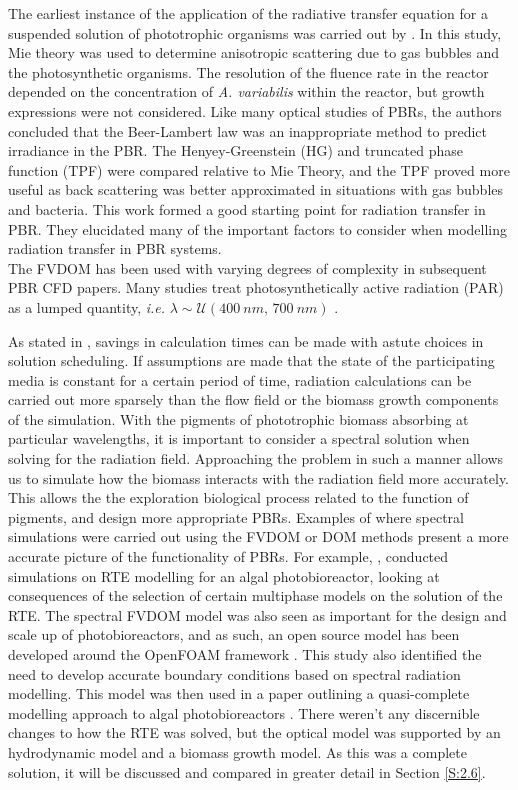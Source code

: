 The earliest instance of the application of the radiative transfer equation for a suspended solution of phototrophic organisms was carried out by \cite{Berberoglu2007}. In this study, Mie theory was used to determine anisotropic scattering due to gas bubbles and the photosynthetic organisms. The resolution of the fluence rate in the reactor depended on the concentration of \textit{A. variabilis} within the reactor, but growth expressions were not considered. Like many optical studies of PBRs, the authors concluded that the Beer-Lambert law was an inappropriate method to predict irradiance in the PBR. The Henyey-Greenstein (HG) and truncated phase function (TPF) were compared relative to Mie Theory, and the TPF proved more useful as back scattering was better approximated in situations with gas bubbles and bacteria. This work formed a good starting point for radiation transfer in PBR. They elucidated many of the important factors to consider when modelling radiation transfer in PBR systems. \\
The FVDOM has been used with varying degrees of complexity in subsequent PBR CFD papers. Many studies treat photosynthetically active radiation (PAR) as a lumped quantity, \textit{i.e.} $\lambda \sim \mathcal{U}(400\ nm ,\, 700\ nm)$
\cite{Soman2015,Pandey2015,Wheaton2012,Huang2011,Eltayeb2010}. 

As stated in \cite{Krishnamoorthy2014}, savings in calculation times can be made with astute choices in solution scheduling. If assumptions are made that the state of the participating media is constant for a certain period of time, radiation calculations can be carried out more sparsely than the flow field or the biomass growth components of the simulation. With the pigments of phototrophic biomass absorbing at particular wavelengths, it is important to consider a spectral solution when solving for the radiation field. Approaching the problem in such a manner allows us to simulate how the biomass interacts with the radiation field more accurately. This allows the the exploration biological process related to the function of pigments, and design more appropriate PBRs. Examples of where spectral simulations were carried out using the FVDOM or DOM methods present a more accurate picture of the functionality of PBRs. For example, \cite{Krishnamoorthy2014},  conducted simulations on RTE modelling for an algal photobioreactor, looking at consequences of the selection of certain multiphase models on the solution of the RTE. The spectral FVDOM model was also seen as important for the design and scale up of photobioreactors, and as such, an open source model has been developed around the OpenFOAM framework \cite{Kong2014}. This study also identified the need to develop accurate boundary conditions based on spectral radiation modelling. This model was then used in a paper outlining a quasi-complete modelling approach to algal photobioreactors \cite{Gao2016}. There weren't any discernible changes to how the RTE was solved, but the optical model was supported by an hydrodynamic model and a biomass growth model. As this was a complete solution, it will be discussed and compared in greater detail in Section \ref{S:2.6}. 

